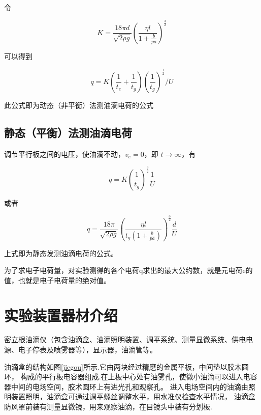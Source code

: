 \documentclass{ctexart}
\begin{document}
  令

  \begin{equation}
    K = \frac{18\pi d}{\sqrt{2\rho g}} (\frac{\eta l}{1+ \frac{b}{pa} })^{\frac{3}{2}}
  \end{equation}

  可以得到

  \begin{equation}
    q = K (\frac{1}{t_{e}} + \frac{1}{t_{g}}) (\frac{1}{t_{g}})^{\frac{1}{2}} / U
  \end{equation}

  此公式即为动态（非平衡）法测油滴电荷的公式

  \subsection{静态（平衡）法测油滴电荷}
  调节平行板之间的电压，使油滴不动，$v_{e} = 0$，即 $t \rightarrow \infty $，有

  \begin{equation}
    q = K (\frac{1}{t_{g}})^{\frac{3}{2}} \frac{1}{U}
  \end{equation}

  或者

  \begin{equation}
    q = \frac{18\pi}{\sqrt{2\rho g}} (\frac{\eta l}{t_{g}(1+ \frac{b}{pa}) })^{\frac{3}{2}} \frac{d}{U}
  \end{equation}

  上式即为静态发测油滴电荷的公式。

  为了求电子电荷量，对实验测得的各个电荷q求出的最大公约数，就是元电荷e的值，也就是电子电荷量的绝对值。

\section{实验装置器材介绍}
密立根油滴仪（包含油滴盒、油滴照明装置、调平系统、测量显微系统、供电电源、电子停表及喷雾器等），显示器，油滴管等。

油滴盒的结构如图\ref{jiegou}所示.它由两块经过精磨的金属平板，中间垫以胶木圆环，
构成的平行板电容器组成.在上板中心处有油雾孔，使微小油滴可以进入电容器中间的电场空间，胶术圆环上有进光孔和观察孔。
进入电场空间内的油滴由照明装置照明，油滴盒可通过调平螺丝调整水平，用水准仪检查水平情况，
油滴盒防风罩前装有测量显微镜，用来观察油滴，在目镜头中装有分划板.
\end{document}
